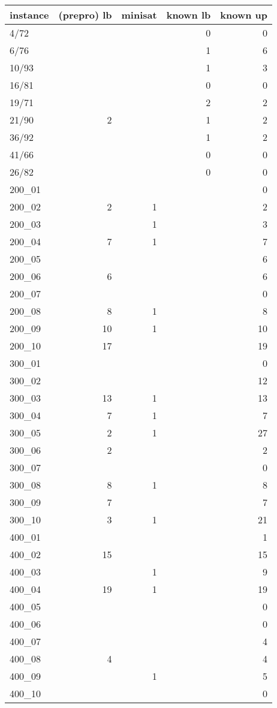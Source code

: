 \begin{tabular}{ | l || r | r || r | r | }
  \hline                        
instance &(prepro) lb	&minisat	&known lb	& known up\\
  \hline                        
4/72	&	&	&0	&0\\
6/76	&	&	&1	&6\\
10/93	&	&	&1	&3\\
16/81	&	&	&0	&0\\
19/71	&	&	&2	&2\\
21/90	&2	&	&1	&2\\
36/92	&	&	&1	&2\\
41/66	&	&	&0	&0\\
26/82	&	&	&0	&0\\
  \hline                        
200\_01	&	&	&	&0\\
200\_02	&2	&1	&	&2\\
200\_03	&	&1	&	&3\\
200\_04	&7	&1	&	&7\\
200\_05	&	&	&	&6\\
200\_06	&6	&	&	&6\\
200\_07	&	&	&	&0\\
200\_08	&8	&1	&	&8\\
200\_09	&10	&1	&	&10\\
200\_10	&17	&	&	&19\\
300\_01	&	&	&	&0\\
300\_02	&	&	&	&12\\
300\_03	&13	&1	&	&13\\
300\_04	&7	&1	&	&7\\
300\_05	&2	&1	&	&27\\
300\_06	&2	&	&	&2\\
300\_07	&	&	&	&0\\
300\_08	&8	&1	&	&8\\
300\_09	&7	&	&	&7\\
300\_10	&3	&1	&	&21\\
400\_01	&	&	&	&1\\
400\_02	&15	&	&	&15\\
400\_03	&	&1	&	&9\\
400\_04	&19	&1	&	&19\\
400\_05	&	&	&	&0\\
400\_06	&	&	&	&0\\
400\_07	&	&	&	&4\\
400\_08	&4	&	&	&4\\
400\_09	&	&1	&	&5\\
400\_10	&	&	&	&0\\
  \hline                        
\end{tabular}


